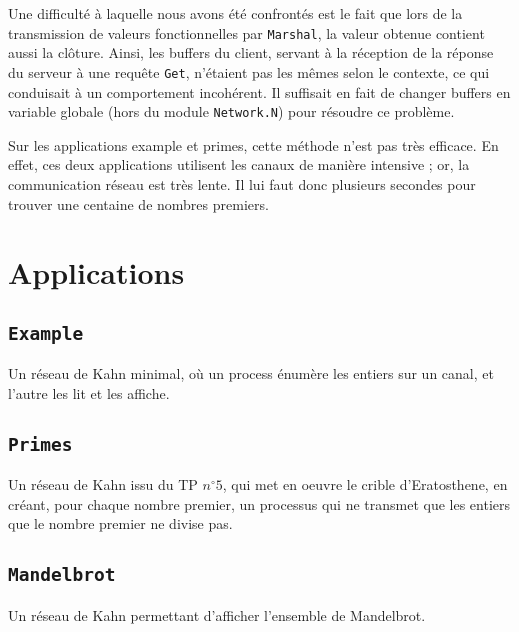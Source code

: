 \documentclass[11pt,a4paper]{article}
\renewcommand{\tt}[1]{\texttt{#1}}
\begin{document}
Une difficulté à laquelle nous avons été confrontés est le fait que lors de la
transmission de valeurs fonctionnelles par \tt{Marshal}, la valeur obtenue contient
aussi la clôture. Ainsi, les buffers du client, servant à la réception de la
réponse du serveur à une requête \tt{Get}, n'étaient pas les mêmes selon le contexte,
ce qui conduisait à un comportement incohérent. Il suffisait en fait de changer
buffers en variable globale (hors du module \tt{Network.N}) pour résoudre ce
problème.

Sur les applications example et primes, cette méthode n'est pas très efficace.
En effet, ces deux applications utilisent les canaux de manière intensive ; or,
la communication réseau est très lente. Il lui faut donc plusieurs secondes pour
trouver une centaine de nombres premiers.



\section{Applications}


\subsection{\tt{Example}}

Un réseau de Kahn minimal, où un process énumère les entiers sur un canal, et
l'autre les lit et les affiche.


\subsection{\tt{Primes}}

Un réseau de Kahn issu du TP $n^\circ 5$, qui met en oeuvre le crible d'Eratosthene,
en créant, pour chaque nombre premier, un processus qui ne transmet que les
entiers que le nombre premier ne divise pas.

\subsection{\tt{Mandelbrot}}

Un réseau de Kahn permettant d'afficher l'ensemble de Mandelbrot.
\end{document}
